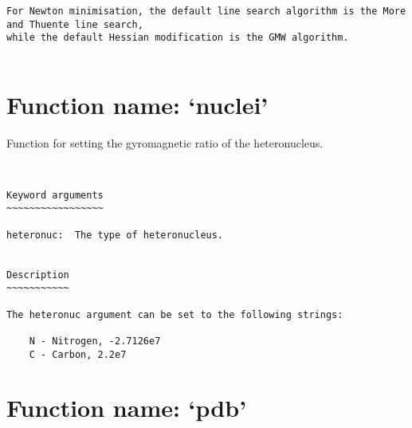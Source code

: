 \begin{verbatim}
For Newton minimisation, the default line search algorithm is the More and Thuente line search,
while the default Hessian modification is the GMW algorithm.


\end{verbatim}

\normalsize
\section{Function name: `nuclei'}

Function for setting the gyromagnetic ratio of the heteronucleus.
\scriptsize
\begin{verbatim}


Keyword arguments
~~~~~~~~~~~~~~~~~

heteronuc:  The type of heteronucleus.


Description
~~~~~~~~~~~

The heteronuc argument can be set to the following strings:

    N - Nitrogen, -2.7126e7
    C - Carbon, 2.2e7

\end{verbatim}

\normalsize
\section{Function name: `pdb'}

